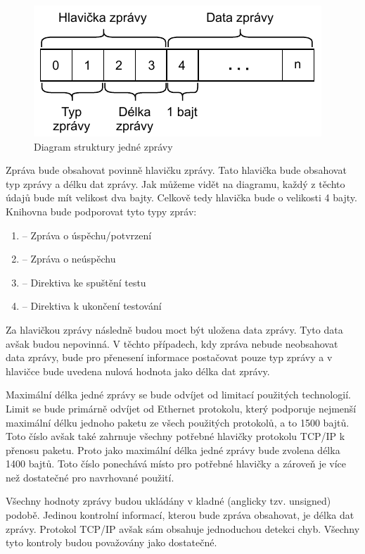 \begin{figure}[htbp]
    \centering 
    \includegraphics{assets/img/message.pdf}
    \caption{Diagram struktury jedné zprávy}
    \label{fig:message}
\end{figure}

Zpráva bude obsahovat povinně hlavičku zprávy. Tato hlavička bude obsahovat typ zprávy a délku dat zprávy. Jak můžeme vidět na diagramu, každý z těchto údajů bude mít velikost dva bajty. Celkově tedy hlavička bude o velikosti 4 bajty. Knihovna bude podporovat tyto typy zpráv:

\begin{enumerate}
    \item {} -- Zpráva o úspěchu/potvrzení
    \item {} -- Zpráva o neúspěchu
    \item {} -- Direktiva ke spuštění testu
    \item {} -- Direktiva k ukončení testování
\end{enumerate}

Za hlavičkou zprávy následně budou moct být uložena data zprávy. Tyto data avšak budou nepovinná. V těchto případech, kdy zpráva nebude neobsahovat data zprávy, bude pro přenesení informace postačovat pouze typ zprávy a v hlavičce bude uvedena nulová hodnota jako délka dat zprávy. 

Maximální délka jedné zprávy se bude odvíjet od limitací použitých technologií. Limit se bude primárně odvíjet od Ethernet protokolu, který podporuje nejmenší maximální délku jednoho paketu ze všech použitých protokolů, a to 1500 bajtů. Toto číslo avšak také zahrnuje všechny potřebné hlavičky protokolu TCP/IP k přenosu paketu. Proto jako maximální délka jedné zprávy bude zvolena délka 1400 bajtů. Toto číslo ponechává místo pro potřebné hlavičky a zároveň je více než dostatečné pro navrhované použití. \cite{max_packet_size} 

Všechny hodnoty zprávy budou ukládány v kladné (anglicky tzv. unsigned) podobě. Jedinou kontrolní informací, kterou bude zpráva obsahovat, je délka dat zprávy. Protokol TCP/IP avšak sám obsahuje jednoduchou detekci chyb. Všechny tyto kontroly budou považovány jako dostatečné.

